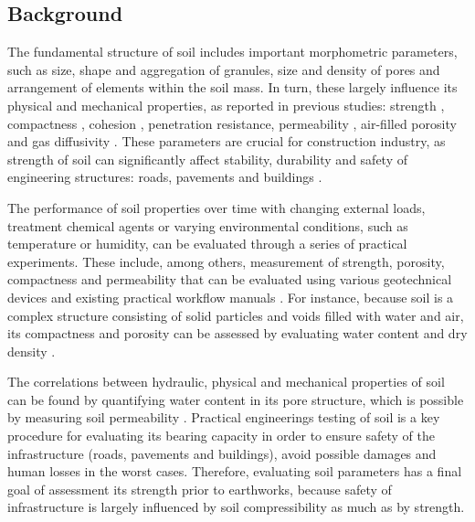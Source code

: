 \documentclass{amestyle}
\begin{document}
\subsection{Background} 
The fundamental structure of soil includes important morphometric parameters, such as size, shape and aggregation of granules, size and density of pores and arrangement of elements within the soil mass. In turn, these largely influence its physical and mechanical properties, as reported in previous studies: strength \cite{5775686}, compactness \cite{5774579,9082607,WANG2022100703}, cohesion \cite{Deviren,KIM2021106163}, penetration resistance, permeability \cite{GAO2022100754,CHOONG2022107075}, air-filled porosity \cite{POHL2021115124,ZHANG2021105738,ZIEGLERRIVERA2021103194} and gas diffusivity \cite{Ball}. These parameters are crucial for construction industry, as strength of soil can significantly affect stability, durability and safety of  engineering structures: roads, pavements and buildings \cite{747690,6802685,KULKARNI2022125363,ZHANG2020119293,OBIANYO2020120677,BAKAIYANG2021e00626,HAN20181187,KAMAL20212660,WANG2022100703}.

The performance of soil properties over time with changing external loads, treatment chemical agents or varying environmental conditions, such as temperature or humidity, can be evaluated through a series of practical experiments. These include, among others, measurement of strength, porosity, compactness and permeability that can be evaluated using various geotechnical devices and existing practical workflow manuals \cite{Day2001,Davis2008}. For instance, because soil is a complex structure consisting of solid particles and voids filled with water and air, its compactness and porosity can be assessed by evaluating water content and dry density \cite{Hillel}. 

The correlations between hydraulic, physical and mechanical properties of soil can be found by quantifying water content in its pore structure, which is possible by measuring soil permeability \cite{BARBOSA2022115673}. Practical engineerings testing of soil is a key procedure for evaluating its bearing capacity in order to ensure safety of the infrastructure (roads, pavements and buildings), avoid possible damages and human losses in the worst cases. Therefore, evaluating soil parameters has a final goal of assessment its strength prior to earthworks, because safety of infrastructure is largely influenced by soil compressibility as much as by strength.
\end{document}
